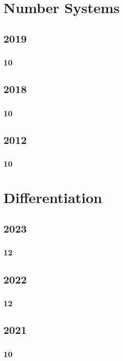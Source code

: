 \documentclass[11pt]{book}
\begin{document}
\chapter{Number Systems}
\section{2019}
\subsection{10}

\section{2018}
\subsection{10}

\section{2012}
\subsection{10}



\chapter{Differentiation}
\section{2023}
\subsection{12}


\section{2022}
\subsection{12}

\section{2021}
\subsection{10}

\end{document}
